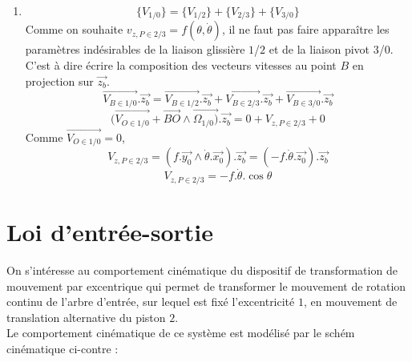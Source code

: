 {\begin{enumerate}
\[ (\overrightarrow{V_{O \in 1/0}}+\overrightarrow{BO} \wedge \overrightarrow{\Omega_{1/0})}.\overrightarrow{y_b}=V_{y,P \in 1/2}+(V_{z,P \in 2/3}.\overrightarrow{z_b}).\overrightarrow{y_b}+0 \]
Comme $\overrightarrow{V_{O \in 1/0}}=0$ et $(V_{z,P \in 2/3}.\overrightarrow{z_b}).\overrightarrow{y_b}=0$,
\[ V_{y,P \in 1/2}=(f.\overrightarrow{y_0} \wedge \dot{\theta}.\overrightarrow{x_0}).\overrightarrow{y_b}=(-f.\dot{\theta}.\overrightarrow{z_0}).\overrightarrow{y_b}=-f.\dot{\theta}.\cos(\frac{\pi}{2}-\theta) \]
\[ V_{y,P \in 1/2}=-f.\dot{\theta}.\sin \theta \]
\item\[ \{V_{1/0}\}=\{V_{1/2}\}+\{V_{2/3}\}+\{V_{3/0}\} \]
Comme on souhaite $v_{z,P \in 2/3}=f(\theta,\dot{\theta})$, il ne faut pas faire apparaître les paramètres indésirables de la liaison glissière $1$/$2$ et de la liaison pivot $3$/$0$. C'est à dire écrire la composition des vecteurs vitesses au point $B$ en projection sur $\overrightarrow{z_b}$.
\[ \overrightarrow{V_{B \in 1/0}}.\overrightarrow{z_b}=\overrightarrow{V_{B \in 1/2}}.\overrightarrow{z_b}+\overrightarrow{V_{B \in 2/3}}.\overrightarrow{z_b}+\overrightarrow{V_{B \in 3/0}}.\overrightarrow{z_b} \]
\[ (\overrightarrow{V_{O \in 1/0}}+\overrightarrow{BO} \wedge \overrightarrow{\Omega_{1/0})}.\overrightarrow{z_b}=0+V_{z,P \in 2/3}+0 \]
Comme $\overrightarrow{V_{O \in 1/0}}=0$,
\[ V_{z,P \in 2/3}=(f.\overrightarrow{y_0} \wedge \dot{\theta}.\overrightarrow{x_0}).\overrightarrow{z_b}=(-f.\dot{\theta}.\overrightarrow{z_0}).\overrightarrow{z_b} \]
\[ V_{z,P \in 2/3}=-f.\dot{\theta}.\cos \theta \]
\end{enumerate}
}
\newpage


\section{Loi d'entrée-sortie}


On s'intéresse au comportement cinématique du dispositif de transformation de mouvement par excentrique qui permet de transformer le mouvement de rotation continu de l'arbre d'entrée, sur lequel est fixé l'excentricité $1$, en mouvement de translation alternative du piston $2$.\\
Le comportement cinématique de ce système est modélisé par le schém cinématique ci-contre :

